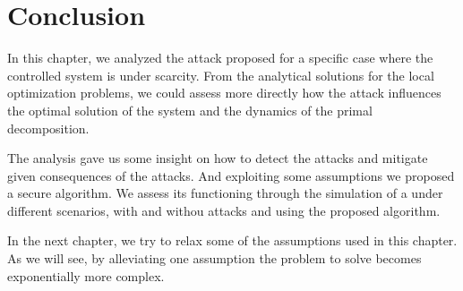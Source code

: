 \documentclass[../main.tex]{subfiles}
\begin{document}
\section{Conclusion}\label{sec:conclusion_eq}
In this chapter, we analyzed the \fdi{} attack proposed for a specific case where the controlled system is under scarcity.
From the analytical solutions for the local optimization problems, we could assess more directly how the attack influences the optimal solution of the system and the dynamics of the primal decomposition.

The analysis gave us some insight on how to detect the attacks and mitigate given consequences of the attacks.
And exploiting some assumptions we proposed a secure \dmpc{} algorithm.
We assess its functioning through the simulation of a \dhn{} under different scenarios, with and withou attacks and using the proposed algorithm.

In the next chapter, we try to relax some of the assumptions used in this chapter.
As we will see, by alleviating one assumption the problem to solve becomes exponentially more complex.
\end{document}
